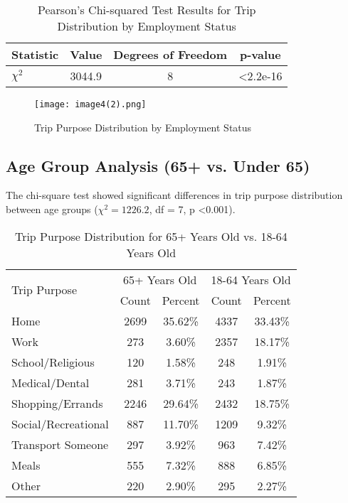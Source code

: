 \begin{table}[h!]
    \centering
    \caption{Pearson's Chi-squared Test Results for Trip Distribution by Employment Status}
    \label{tab:Pearson's Chi-squared Test Results for Trip Distribution by Employment Status}
    \begin{tabular}{lccc}
    \toprule
      Statistic & Value & Degrees of Freedom & p-value \\
    \midrule
     \(\chi^2\) & 3044.9 & 8 & \textless 2.2e-16 \\
    \bottomrule
    \end{tabular}
\end{table}

\begin{figure}[H]
    \centering
    \texttt{[image: image4(2).png]}
    \caption{Trip Purpose Distribution by Employment Status}
    \label{fig:enter-label}
\end{figure}




\subsection{Age Group Analysis (65+ vs. Under 65)}
The chi-square test showed significant differences in trip purpose distribution between age groups ($\chi^2 = 1226.2$, df = 7, p \textless 0.001).


\begin{table}[h!]
  \centering
  \caption{Trip Purpose Distribution for 65+ Years Old vs. 18-64 Years Old}
  \label{tab:trip_purpose_age}
  \begin{tabular}{lcccc}
    \toprule
    \multirow{2}{*}{Trip Purpose} & \multicolumn{2}{c}{65+ Years Old} & \multicolumn{2}{c}{18-64 Years Old} \\
    \cmidrule(lr){2-3} \cmidrule(lr){4-5}
                                 & Count & Percent & Count & Percent \\
    \midrule
    Home                         & 2699  & 35.62\% & 4337  & 33.43\% \\
    Work                         & 273   & 3.60\%  & 2357  & 18.17\% \\
    School/Religious   & 120   & 1.58\%  & 248   & 1.91\%  \\
    Medical/Dental               & 281   & 3.71\%  & 243   & 1.87\%  \\
    Shopping/Errands             & 2246  & 29.64\% & 2432  & 18.75\% \\
    Social/Recreational          & 887   & 11.70\% & 1209  & 9.32\%  \\
    Transport Someone            & 297   & 3.92\%  & 963   & 7.42\%  \\
    Meals                        & 555   & 7.32\%  & 888   & 6.85\%  \\
    Other                        & 220   & 2.90\%  & 295   & 2.27\%  \\
    \bottomrule
  \end{tabular}
\end{table}

